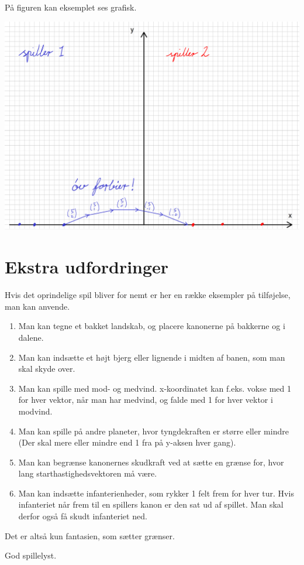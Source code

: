 \documentclass[a4paper, 12pt]{article}
\begin{document}
På figuren kan eksemplet ses grafisk.

\begin{center}
\includegraphics[width=.9\linewidth]{./img/Regneeksempel.png}
\end{center}

\newpage
\section*{Ekstra udfordringer}
\label{sec:orgb4c01bf}
Hvis det oprindelige spil bliver for nemt er her en række eksempler på tilføjelse, man kan anvende.

\begin{enumerate}
\item Man kan tegne et bakket landskab, og placere kanonerne på bakkerne og i dalene.
\item Man kan indsætte et højt bjerg eller lignende i midten af banen, som man skal skyde over.
\item Man kan spille med mod- og medvind.
x-koordinatet kan f.eks. vokse med 1 for hver vektor, når man har medvind, og falde med 1 for hver vektor i modvind.
\item Man kan spille på andre planeter, hvor tyngdekraften er større eller mindre (Der skal mere eller mindre end 1 fra på y-aksen hver gang).
\item Man kan begrænse kanonernes skudkraft ved at sætte en grænse for, hvor lang starthastighedsvektoren må være.
\item Man kan indsætte infanterienheder, som rykker 1 felt frem for hver tur. Hvis infanteriet når frem til en spillers kanon er den sat ud af spillet. Man skal derfor også få skudt infanteriet ned.
\end{enumerate}

Det er altså kun fantasien, som sætter grænser.

God spillelyst.
\end{document}
